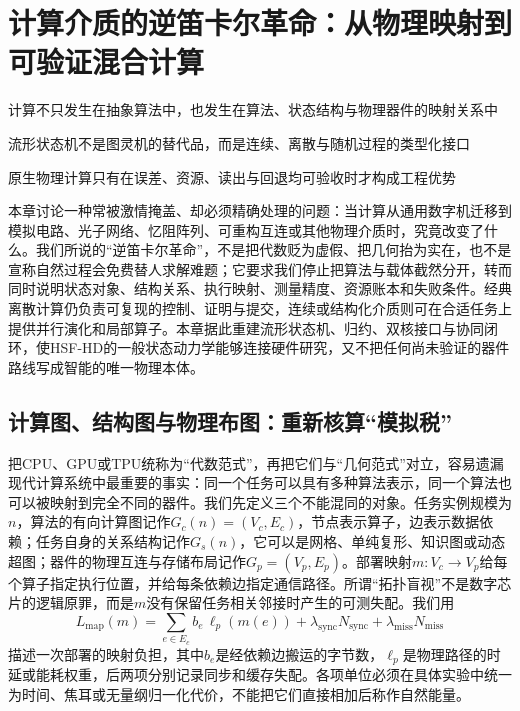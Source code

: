 \chapter{计算介质的逆笛卡尔革命：从物理映射到可验证混合计算}
\label{chp:reverse_cartesian_revolution}

\begin{introduction}
    \item 计算不只发生在抽象算法中，也发生在算法、状态结构与物理器件的映射关系中
    \item 流形状态机不是图灵机的替代品，而是连续、离散与随机过程的类型化接口
    \item 原生物理计算只有在误差、资源、读出与回退均可验收时才构成工程优势
\end{introduction}

本章讨论一种常被激情掩盖、却必须精确处理的问题：当计算从通用数字机迁移到模拟电路、光子网络、忆阻阵列、可重构互连或其他物理介质时，究竟改变了什么。我们所说的“逆笛卡尔革命”，不是把代数贬为虚假、把几何抬为实在，也不是宣称自然过程会免费替人求解难题；它要求我们停止把算法与载体截然分开，转而同时说明状态对象、结构关系、执行映射、测量精度、资源账本和失败条件。经典离散计算仍负责可复现的控制、证明与提交，连续或结构化介质则可在合适任务上提供并行演化和局部算子。本章据此重建流形状态机、归约、双核接口与协同闭环，使HSF-HD的一般状态动力学能够连接硬件研究，又不把任何尚未验证的器件路线写成智能的唯一物理本体。

\section{计算图、结构图与物理布图：重新核算“模拟税”}
\label{sec:algebraic_tyranny}

把CPU、GPU或TPU统称为“代数范式”，再把它们与“几何范式”对立，容易遗漏现代计算系统中最重要的事实：同一个任务可以具有多种算法表示，同一个算法也可以被映射到完全不同的器件。我们先定义三个不能混同的对象。任务实例规模为$n$，算法的有向计算图记作$G_c(n)=(V_c,E_c)$，节点表示算子，边表示数据依赖；任务自身的关系结构记作$G_s(n)$，它可以是网格、单纯复形、知识图或动态超图；器件的物理互连与存储布局记作$G_p=(V_p,E_p)$。部署映射$m:V_c\rightarrow V_p$给每个算子指定执行位置，并给每条依赖边指定通信路径。所谓“拓扑盲视”不是数字芯片的逻辑原罪，而是$m$没有保留任务相关邻接时产生的可测失配。我们用
\[
L_{\mathrm{map}}(m)=
\sum_{e\in E_c}b_e\,\ell_p(m(e))
+\lambda_{\mathrm{sync}}N_{\mathrm{sync}}
+\lambda_{\mathrm{miss}}N_{\mathrm{miss}}
\]
描述一次部署的映射负担，其中$b_e$是经依赖边搬运的字节数，$\ell_p$是物理路径的时延或能耗权重，后两项分别记录同步和缓存失配。各项单位必须在具体实验中统一为时间、焦耳或无量纲归一化代价，不能把它们直接相加后称作自然能量。

